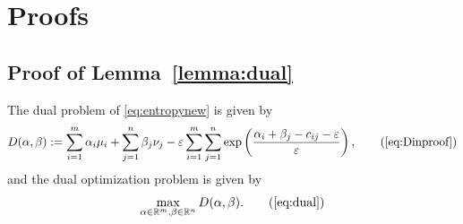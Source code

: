 \appendix

\chapter{Proofs}
\label{ch:proofs}
\section{Proof of Lemma~\ref{lemma:dual}}
\label{sec:prooflemmadual}

\renewcommand{\thetheorem}{4.\arabic{theorem}}

\begin{lemma}
	The dual problem of \eqref{eq:entropynew} is given by 
	\begin{equation*}
		D(\alpha, \beta) := \sum_{i=1}^m \alpha_i \mu_i + \sum_{j=1}^n \beta_j \nu_j - \varepsilon \sum_{i=1}^m \sum_{j=1}^n \exp\left(\frac{\alpha_i + \beta_j - c_{ij} - \varepsilon}{\varepsilon}\right),
		\tag{\ref{eq:Dinproof}}
	\end{equation*}
	and the dual optimization problem is given by 
	\begin{equation*}
		\max_{\alpha \in \R^m, \beta\in \R^n} D(\alpha, \beta).
		\tag{\ref{eq:dual}}
	\end{equation*}
\end{lemma}
